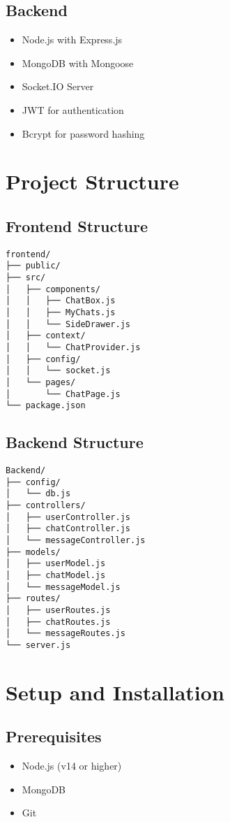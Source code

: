 \documentclass[12pt,a4paper]{article}
\begin{document}
\subsection{Backend}
\begin{itemize}
    \item Node.js with Express.js
    \item MongoDB with Mongoose
    \item Socket.IO Server
    \item JWT for authentication
    \item Bcrypt for password hashing
\end{itemize}

\section{Project Structure}
\subsection{Frontend Structure}
\begin{lstlisting}
frontend/
├── public/
├── src/
│   ├── components/
│   │   ├── ChatBox.js
│   │   ├── MyChats.js
│   │   └── SideDrawer.js
│   ├── context/
│   │   └── ChatProvider.js
│   ├── config/
│   │   └── socket.js
│   └── pages/
│       └── ChatPage.js
└── package.json
\end{lstlisting}

\subsection{Backend Structure}
\begin{lstlisting}
Backend/
├── config/
│   └── db.js
├── controllers/
│   ├── userController.js
│   ├── chatController.js
│   └── messageController.js
├── models/
│   ├── userModel.js
│   ├── chatModel.js
│   └── messageModel.js
├── routes/
│   ├── userRoutes.js
│   ├── chatRoutes.js
│   └── messageRoutes.js
└── server.js
\end{lstlisting}

\section{Setup and Installation}
\subsection{Prerequisites}
\begin{itemize}
    \item Node.js (v14 or higher)
    \item MongoDB
    \item Git
\end{itemize}
\end{document}

